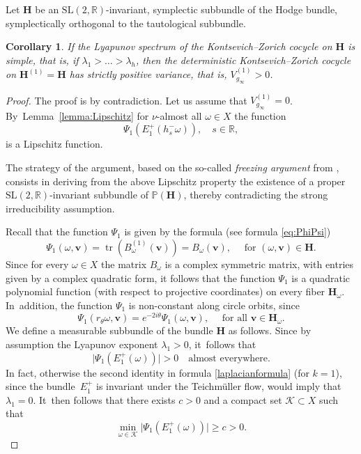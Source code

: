 \documentclass[JEP,XML,SOM,Unicode,published]{cedram}
\DeclareMathOperator{\tr}{tr}
\theoremstyle{plain}
\newtheorem{cor}[thm]{Corollary}
\theoremstyle{definition}
\numberwithin{equation}{subsection}
\newcommand\bP{\mathbb{P}}
\newcommand\bR{\mathbb{R}}\let\R\bR
\newcommand{\SL}{\mathrm{SL}}
\newcommand{\bfH}{\boldsymbol{H}}
\newcommand{\bfv}{\boldsymbol{v}}
\begin{document}
Let ${\bfH}$ be an
$\SL(2, \R)$-invariant, symplectic subbundle of the Hodge bundle, symplectically orthogonal to the tautological subbundle.

\begin{cor}\label{cor:freezing}
If the Lyapunov spectrum of the Kontsevich--Zorich cocycle on
$\bfH$ is simple, that is, if $\lambda_1> \dots >\lambda_h$,
then the deterministic Kontsevich--Zorich cocycle on ${\bfH}^{(1)}= {\bfH}$ has strictly positive variance, that is, $V^{(1)}_{g_\infty} > 0$.
\end{cor}

\begin{proof} The proof is by contradiction.
Let us assume that $V^{(1)}_{g_\infty}=0$. By~Lemma~\ref{lemma:Lipschitz} for $\nu$-almost all $\omega \in X$ the function
\[
\Psi_1 (E^+_1(h^-_s \omega)), \quad s \in \R,
\]
is a Lipschitz function.

The strategy of the argument, based on the so-called {\it freezing argument} from \cite{CF20}, consists in deriving from the above Lipschitz property the existence of a proper $\SL(2,\bR)$-invariant subbundle of $\bP({\bfH})$, thereby contradicting the strong irreducibility assumption.

Recall that the function $\Psi_1$ is given by
the formula (see formula \eqref{eq:PhiPsi})
\[
\Psi_1 (\omega, \bfv)= \tr(B^{(1)}_\omega(\bfv)) = B_\omega(\bfv),
\quad \text{ for } (\omega, {\bfv}) \in {\bfH}.
\]
Since for every $\omega \in X$ the matrix $B_\omega$ is a complex symmetric matrix, with
entries given by a complex quadratic form,
it follows that the function $\Psi_1$ is a quadratic polynomial function (with respect to projective coordinates) on every fiber ${\bfH}_\omega$. In~addition, the function $\Psi_1$ is non-constant along circle orbits, since
\[
\Psi_1 (r_{\theta}\omega, \bfv) =
e^{-2i \theta} \Psi_1 (\omega, \bfv), \quad \text{ for all } {\bfv} \in {\bfH}_\omega.
\]
We define a measurable subbundle of the bundle
${\bfH}$ as follows. Since by assumption the Lyapunov exponent
$\lambda_1 >0$, it~follows that
\[
\vert \Psi_1(E^+_1(\omega)) \vert >0 \quad \text{almost everywhere.}
\]
In fact, otherwise the second identity in formula \eqref{laplacianformula} (for $k=1$), since the bundle~$E^+_1$ is invariant under the Teichmüller flow, would imply that $\lambda_1=0$. It~then follows that there exists $c>0$ and a compact set $\mathcal K \subset X$ such that
\begin{equation}
\label{eq:norm_lbound}
\min_{\omega \in \mathcal{K}} \vert \Psi_1(E^+_1(\omega)) \vert \geq c>0.
\end{equation}


\end{proof}
\end{document}
